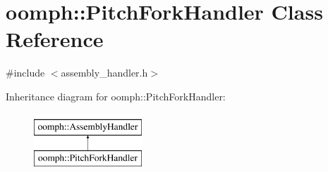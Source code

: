 \hypertarget{classoomph_1_1PitchForkHandler}{}\section{oomph\+:\+:Pitch\+Fork\+Handler Class Reference}
\label{classoomph_1_1PitchForkHandler}


{\ttfamily \#include $<$assembly\+\_\+handler.\+h$>$}

Inheritance diagram for oomph\+:\+:Pitch\+Fork\+Handler\+:\begin{figure}[H]
\begin{center}
\leavevmode
\includegraphics[height=2.000000cm]{classoomph_1_1PitchForkHandler}
\end{center}
\end{figure}
